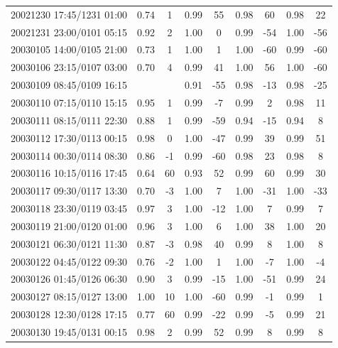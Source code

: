 \documentclass[linenumbers,draft]{agujournal}
\begin{document}
\begin{center}
\begin{longtable}{c||cc|cc|cc|cc}
20021230 17:45/1231 01:00 & 0.74 & 1 & 0.99 & 55 & 0.98 & 60 & 0.98 & 22 \\
20021231 23:00/0101 05:15 & 0.92 & 2 & 1.00 & 0 & 0.99 & -54 & 1.00 & -56 \\
20030105 14:00/0105 21:00 & 0.73 & 1 & 1.00 & 1 & 1.00 & -60 & 0.99 & -60 \\
20030106 23:15/0107 03:00 & 0.70 & 4 & 0.99 & 41 & 1.00 & 56 & 1.00 & -60 \\
20030109 08:45/0109 16:15 & & & 0.91 & -55 & 0.98 & -13 & 0.98 & -25 \\
20030110 07:15/0110 15:15 & 0.95 & 1 & 0.99 & -7 & 0.99 & 2 & 0.98 & 11 \\
20030111 08:15/0111 22:30 & 0.88 & 1 & 0.99 & -59 & 0.94 & -15 & 0.94 & 8 \\
20030112 17:30/0113 00:15 & 0.98 & 0 & 1.00 & -47 & 0.99 & 39 & 0.99 & 51 \\
20030114 00:30/0114 08:30 & 0.86 & -1 & 0.99 & -60 & 0.98 & 23 & 0.98 & 8 \\
20030116 10:15/0116 17:45 & 0.64 & 60 & 0.93 & 52 & 0.99 & 60 & 0.99 & 30 \\
20030117 09:30/0117 13:30 & 0.70 & -3 & 1.00 & 7 & 1.00 & -31 & 1.00 & -33 \\
20030118 23:30/0119 03:45 & 0.97 & 3 & 1.00 & -12 & 1.00 & 7 & 0.99 & 7 \\
20030119 21:00/0120 01:00 & 0.96 & 3 & 1.00 & 6 & 1.00 & 38 & 1.00 & 20 \\
20030121 06:30/0121 11:30 & 0.87 & -3 & 0.98 & 40 & 0.99 & 8 & 1.00 & 8 \\
20030122 04:45/0122 09:30 & 0.76 & -2 & 1.00 & 1 & 1.00 & -7 & 1.00 & -4 \\
20030126 01:45/0126 06:30 & 0.90 & 3 & 0.99 & -15 & 1.00 & -51 & 0.99 & 24 \\
20030127 08:15/0127 13:00 & 1.00 & 10 & 1.00 & -60 & 0.99 & -1 & 0.99 & 1 \\
20030128 12:30/0128 17:15 & 0.77 & 60 & 0.99 & -22 & 0.99 & -5 & 0.99 & 21 \\
20030130 19:45/0131 00:15 & 0.98 & 2 & 0.99 & 52 & 0.99 & 8 & 0.99 & 8 \\
\end{longtable}
\end{center}

\pagebreak
\end{document}
